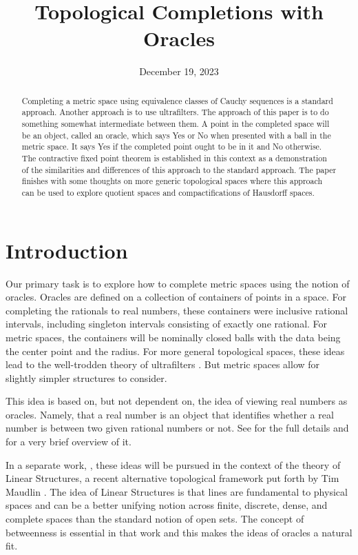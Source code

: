 \documentclass[12pt]{article}
\title{Topological Completions with Oracles}
\date{December 19, 2023}
\begin{document}
\maketitle
\begin{abstract}
Completing a metric space using equivalence classes of Cauchy sequences is a standard approach. Another approach is to use ultrafilters. The approach of this paper is to do something somewhat intermediate between them. A point in the completed space will be an object, called an oracle, which says Yes or No when presented with a ball in the metric space. It says Yes if the completed point ought to be in it and No otherwise. The contractive fixed point theorem is established in this context as a demonstration of the similarities and differences of this approach to the standard approach. The paper finishes with some thoughts on more generic topological spaces where this approach can be used to explore quotient spaces and compactifications of Hausdorff spaces. 
\end{abstract}

\tableofcontents

\section{Introduction}

Our primary task is to explore how to complete metric spaces using the notion of oracles. Oracles are defined on a collection of containers of points in a space. For completing the rationals to real numbers, these containers were inclusive rational intervals, including singleton intervals consisting of exactly one rational. For metric spaces, the containers will be nominally closed balls with the data being the center point and the radius. For more general topological spaces, these ideas lead to the well-trodden theory of ultrafilters \cite{samuel}. But metric spaces allow for slightly simpler structures to consider. 

This idea is based on, but not dependent on, the idea of viewing real numbers as oracles. Namely, that a real number is an object that identifies whether a real number is between two given rational numbers or not. See \cite{taylor23main} for the full details and \cite{taylor23teaser} for a very brief overview of it. 
 
In a separate work, \cite{taylor23maudlin}, these ideas will be pursued in the context of the theory of Linear Structures, a recent alternative topological framework put forth by Tim Maudlin \cite{maudlin}. The idea of Linear Structures is that lines are fundamental to physical spaces and can be a better unifying notion across finite, discrete, dense, and complete spaces than the standard notion of open sets. The concept of betweenness is essential in that work and this makes the ideas of oracles a natural fit. 
\end{document}

